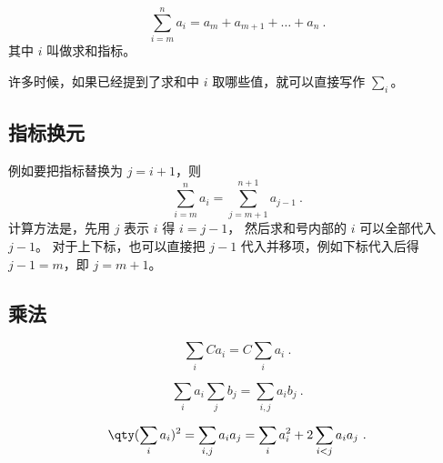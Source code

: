 
\begin{issues}
\issueDraft
\end{issues}

\begin{equation}
\sum_{i=m}^n a_i = a_m + a_{m+1} + \dots + a_n~.
\end{equation}
其中 $i$ 叫做求和指标。

许多时候，如果已经提到了求和中 $i$ 取哪些值，就可以直接写作 $\sum\limits_i$。

\subsection{指标换元}
例如要把指标替换为 $j=i+1$，则
\begin{equation}
\sum_{i=m}^n a_i = \sum_{j=m+1}^{n+1} a_{j-1} ~.
\end{equation}
计算方法是，先用 $j$ 表示 $i$ 得 $i=j-1$， 然后求和号内部的 $i$ 可以全部代入 $j-1$。 对于上下标，也可以直接把 $j-1$ 代入并移项，例如下标代入后得 $j-1=m$，即 $j=m+1$。

\subsection{乘法}
\begin{equation}
\sum_i C a_i = C\sum_i a_i~.
\end{equation}

\begin{equation}
\sum_i a_i \sum_j b_j = \sum_{i,j} a_i b_j~.
\end{equation}

\begin{equation}
\qty(\sum_i a_i)^2 = \sum_{i,j} a_i a_j = \sum_i a_i^2 + 2\sum_{i<j} a_i a_j~.
\end{equation}
